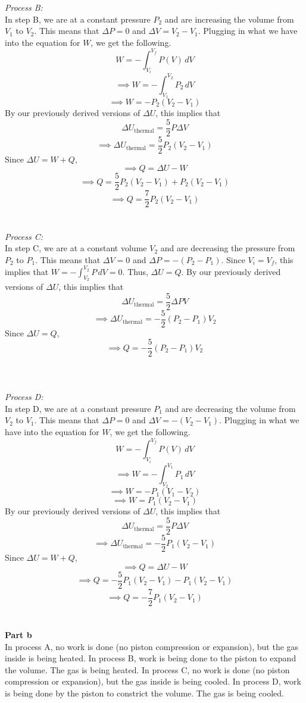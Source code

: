 \documentclass[12pt]{article}
\newcommand{\ds}{\displaystyle}
\begin{document}
\begin{flushleft}
\textit{Process B:}\\
In step B, we are at a constant pressure $P_2$ and are increasing the volume from $V_1$ to $V_2$.
This means that $\Delta P=0$ and $\Delta V=V_2-V_1$.
Plugging in what we have into the equation for $W$, we get the following.
$$W=-\int_{V_i}^{V_f}P(V)\,dV$$
$$\implies W=-\int_{V_1}^{V_2}P_2\,dV$$
$$\implies W=-P_2(V_2-V_1)$$
By our previously derived versions of $\Delta U$, this implies that
$$\Delta U_\text{thermal}=\frac{5}{2}P\Delta V$$
$$\implies\Delta U_\text{thermal}=\frac{5}{2}P_2(V_2-V_1)$$
Since $\Delta U=W+Q$,
$$\implies Q=\Delta U-W$$
$$\implies Q=\frac{5}{2}P_2(V_2-V_1)+P_2(V_2-V_1)$$
$$\implies Q=\frac{7}{2}P_2(V_2-V_1)$$\\~\\

\textit{Process C:}\\
In step C, we are at a constant volume $V_2$ and are decreasing the pressure from $P_2$ to $P_1$.
This means that $\Delta V=0$ and $\Delta P=-(P_2-P_1)$.
Since $V_i=V_f$, this implies that $\ds W=-\int_{V_2}^{V_2}P\,dV=0$.
Thus, $\Delta U=Q$.
By our previously derived versions of $\Delta U$, this implies that
$$\Delta U_\text{thermal}=\frac{5}{2}\Delta PV$$
$$\implies\Delta U_\text{thermal}=-\frac{5}{2}(P_2-P_1)V_2$$
Since $\Delta U=Q$,
$$\implies Q=-\frac{5}{2}(P_2-P_1)V_2$$\\~\\~\\

\textit{Process D:}\\
In step D, we are at a constant pressure $P_1$ and are decreasing the volume from $V_2$ to $V_1$.
This means that $\Delta P=0$ and $\Delta V=-(V_2-V_1)$.
Plugging in what we have into the equation for $W$, we get the following.
$$W=-\int_{V_i}^{V_f}P(V)\,dV$$
$$\implies W=-\int_{V_2}^{V_1}P_1\,dV$$
$$\implies W=-P_1(V_1-V_2)$$
$$\implies W=P_1(V_2-V_1)$$
By our previously derived versions of $\Delta U$, this implies that
$$\Delta U_\text{thermal}=\frac{5}{2}P\Delta V$$
$$\implies\Delta U_\text{thermal}=-\frac{5}{2}P_1(V_2-V_1)$$
Since $\Delta U=W+Q$,
$$\implies Q=\Delta U-W$$
$$\implies Q=-\frac{5}{2}P_1(V_2-V_1)-P_1(V_2-V_1)$$
$$\implies Q=-\frac{7}{2}P_1(V_2-V_1)$$\\~\\



\textbf{Part b}\\
In process A, no work is done (no piston compression or expansion), but the gas inside is being heated.
In process B, work is being done to the piston to expand the volume. The gas is being heated.
In process C, no work is done (no piston compression or expansion), but the gas inside is being cooled.
In process D, work is being done by the piston to constrict the volume. The gas is being cooled.\\~\\~\\



\end{flushleft}
\end{document}
